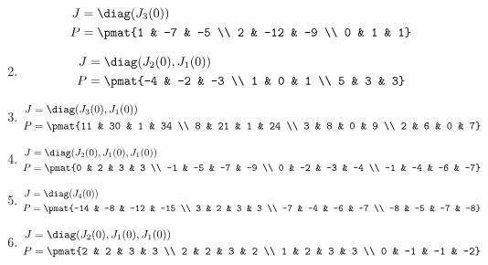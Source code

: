 \begin{enumerate}
\begin{align*}
J &= \diag(J_{3}(0))\\
P &= \pmat{1 & -7 & -5 \\ 2 & -12 & -9 \\ 0 & 1 & 1}
\end{align*}

\item

\begin{align*}
J &= \diag(J_{2}(0), J_{1}(0))\\
P &= \pmat{-4 & -2 & -3 \\ 1 & 0 & 1 \\ 5 & 3 & 3}
\end{align*}

\item

\begin{align*}
J &= \diag(J_{3}(0), J_{1}(0))\\
P &= \pmat{11 & 30 & 1 & 34 \\ 8 & 21 & 1 & 24 \\ 3 & 8 & 0 & 9 \\ 2 & 6 & 0 & 7}
\end{align*}

\item

\begin{align*}
J &= \diag(J_{2}(0), J_{1}(0), J_{1}(0))\\
P &= \pmat{0 & 2 & 3 & 3 \\ -1 & -5 & -7 & -9 \\ 0 & -2 & -3 & -4 \\ -1 & -4 & -6 & -7}
\end{align*}

\item

\begin{align*}
J &= \diag(J_{4}(0))\\
P &= \pmat{-14 & -8 & -12 & -15 \\ 3 & 2 & 3 & 3 \\ -7 & -4 & -6 & -7 \\ -8 & -5 & -7 & -8}
\end{align*}

\item

\begin{align*}
J &= \diag(J_{2}(0), J_{1}(0), J_{1}(0))\\
P &= \pmat{2 & 2 & 3 & 3 \\ 2 & 2 & 3 & 2 \\ 1 & 2 & 3 & 3 \\ 0 & -1 & -1 & -2}
\end{align*}


\end{enumerate}
